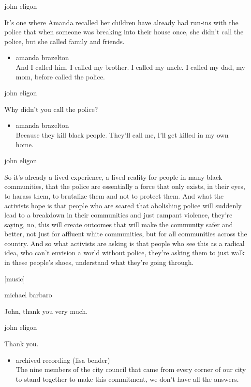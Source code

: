 john eligon

It's one where Amanda recalled her children have already had run-ins
with the police that when someone was breaking into their house once,
she didn't call the police, but she called family and friends.

\begin{itemize}
\tightlist
\item
  amanda brazelton\\
  And I called him. I called my brother. I called my uncle. I called my
  dad, my mom, before called the police.
\end{itemize}

john eligon

Why didn't you call the police?

\begin{itemize}
\tightlist
\item
  amanda brazelton\\
  Because they kill black people. They'll call me, I'll get killed in my
  own home.
\end{itemize}

john eligon

So it's already a lived experience, a lived reality for people in many
black communities, that the police are essentially a force that only
exists, in their eyes, to harass them, to brutalize them and not to
protect them. And what the activists hope is that people who are scared
that abolishing police will suddenly lead to a breakdown in their
communities and just rampant violence, they're saying, no, this will
create outcomes that will make the community safer and better, not just
for affluent white communities, but for all communities across the
country. And so what activists are asking is that people who see this as
a radical idea, who can't envision a world without police, they're
asking them to just walk in these people's shoes, understand what
they're going through.

{[}music{]}

michael barbaro

John, thank you very much.

john eligon

Thank you.

\begin{itemize}
\tightlist
\item
  archived recording (lisa bender)\\
  The nine members of the city council that came from every corner of
  our city to stand together to make this commitment, we don't have all
  the answers.
\end{itemize}

